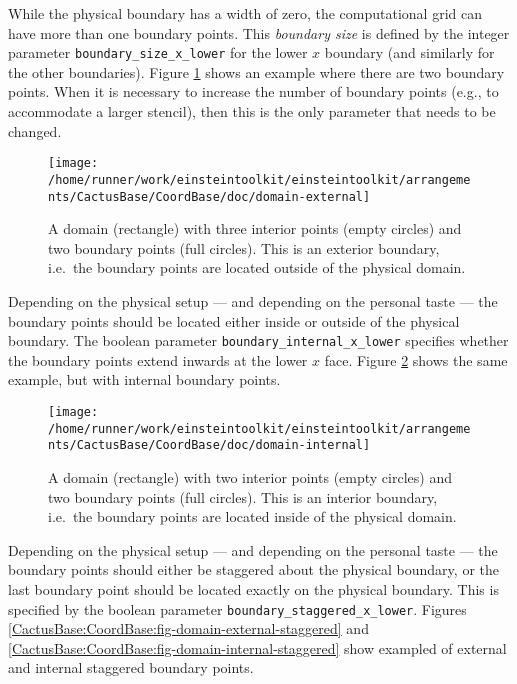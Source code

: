 While the physical boundary has a width of zero, the computational
grid can have more than one boundary points.  This {\emph{boundary
size}} is defined by the integer parameter
{\texttt{boundary\_size\_x\_lower}} for the lower $x$ boundary (and
similarly for the other boundaries).  Figure
{\ref{CactusBase:CoordBase:fig-domain-external}} shows an example
where there are two boundary points.  When it is necessary to increase
the number of boundary points (e.g., to accommodate a larger stencil),
then this is the only parameter that needs to be changed.

\begin{figure}
\begin{center}
\texttt{[image: /home/runner/work/einsteintoolkit/einsteintoolkit/arrangements/CactusBase/CoordBase/doc/domain-external]}
\end{center}
\caption{A domain (rectangle) with three interior points (empty
circles) and two boundary points (full circles).  This is an exterior
boundary, i.e.\ the boundary points are located outside of the
physical domain.}
\label{CactusBase:CoordBase:fig-domain-external}
\end{figure}

Depending on the physical setup --- and depending on the personal
taste --- the boundary points should be located either inside or
outside of the physical boundary.  The boolean parameter
{\texttt{boundary\_internal\_x\_lower}} specifies whether the boundary
points extend inwards at the lower $x$ face.  Figure
{\ref{CactusBase:CoordBase:fig-domain-internal}} shows the same
example, but with internal boundary points.

\begin{figure}
\begin{center}
\texttt{[image: /home/runner/work/einsteintoolkit/einsteintoolkit/arrangements/CactusBase/CoordBase/doc/domain-internal]}
\end{center}
\caption{A domain (rectangle) with two interior points (empty circles)
and two boundary points (full circles).  This is an interior boundary,
i.e.\ the boundary points are located inside of the physical domain.}
\label{CactusBase:CoordBase:fig-domain-internal}
\end{figure}

Depending on the physical setup --- and depending on the personal
taste --- the boundary points should either be staggered about the
physical boundary, or the last boundary point should be located
exactly on the physical boundary.  This is specified by the boolean
parameter {\texttt{boundary\_staggered\_x\_lower}}.  Figures
{\ref{CactusBase:CoordBase:fig-domain-external-staggered}} and
{\ref{CactusBase:CoordBase:fig-domain-internal-staggered}} show
exampled of external and internal staggered boundary points.

